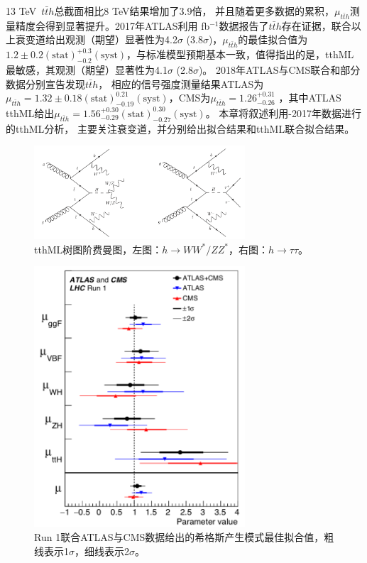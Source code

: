 13 TeV~$t\bar{t}h$总截面相比8 TeV结果增加了3.9倍\cite{Heinemeyer:2013tqa,XSWG13TeV}，
并且随着更多数据的累积，$\mu_{t\bar{t}h}$测量精度会得到显著提升。2017年ATLAS利用 fb$^{-1}$数据报告了$t\bar{t}h$存在证据\cite{Aaboud:2017jvq}，联合以上衰变道给出观测（期望）显著性为4.2$\sigma$ (3.8$\sigma$)，$\mu_{t\bar{t}h}$的最佳拟合值为$1.2\pm0.2(\text{stat})^{+0.3}_{-0.2}(\text{syst})$，与标准模型预期基本一致，值得指出的是，tthML最敏感，其观测（期望）显著性为4.1$\sigma$ (2.8$\sigma$)。
2018年ATLAS与CMS联合\RunOne 和\RunTwo 部分数据分别宣告发现$t\bar{t}h$\cite{Aaboud:2018urx,PhysRevLett.120.231801}，
相应的信号强度测量结果ATLAS为$\mu_{t\bar{t}h}=1.32\pm0.18(\text{stat})^{0.21}_{-0.19}(\text{syst})$，CMS为$\mu_{t\bar{t}h}=1.26^{+0.31}_{-0.26}$
，其中ATLAS tthML给出$\mu_{t\bar{t}h}=1.56^{+0.30}_{-0.29}(\text{stat})^{0.30}_{-0.27}(\text{syst})$。
本章将叙述利用-2017年数据进行的tthML分析，
主要关注\ltwotau 衰变道，并分别给出\ltwotau 拟合结果和tthML联合拟合结果。
\begin{figure}[h]
\centering
 \includegraphics[width=0.7\textwidth]{fig/diagram_tth_LO.png}
 \caption{tthML树图阶费曼图，左图：$h\rightarrow WW^*/ZZ^*$，右图：$h\rightarrow \tau\tau$。}
 \label{fig:diagram_tthML_LO}
\end{figure}

\begin{figure}[h]
\centering
 \includegraphics[width=0.7\textwidth]{fig/ATLAS_CMS_HiggsMes.png}
 \caption{Run 1联合ATLAS与CMS数据给出的希格斯产生模式最佳拟合值\cite{Khachatryan:2016vau}，粗线表示1$\sigma$，细线表示2$\sigma$。}
 \label{fig:HiggsPromu_ATALS_CMS}
\end{figure}

